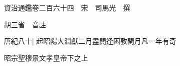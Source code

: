 






























































資治通鑑卷二百六十四　宋　司馬光　撰

胡三省　音註

唐紀八十|{
	起昭陽大淵獻二月盡閤逢困敦閏月凡一年有奇}


昭宗聖穆景文孝皇帝下之上

